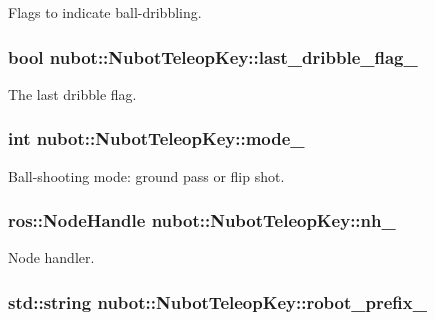 Flags to indicate ball-\/dribbling. 

\hypertarget{classnubot_1_1NubotTeleopKey_a60e6eb5b4d57a2b379f64db50a6c783d}{
\subsubsection[{last\-\_\-dribble\-\_\-flag\-\_\-}]{\setlength{\rightskip}{0pt plus 5cm}bool nubot\-::\-Nubot\-Teleop\-Key\-::last\-\_\-dribble\-\_\-flag\-\_\-\hspace{0.3cm}{\ttfamily [private]}}}\label{classnubot_1_1NubotTeleopKey_a60e6eb5b4d57a2b379f64db50a6c783d}


The last dribble flag. 

\hypertarget{classnubot_1_1NubotTeleopKey_a5d4f917773136b83f6ba268f50c8a0ea}{
\subsubsection[{mode\-\_\-}]{\setlength{\rightskip}{0pt plus 5cm}int nubot\-::\-Nubot\-Teleop\-Key\-::mode\-\_\-\hspace{0.3cm}{\ttfamily [private]}}}\label{classnubot_1_1NubotTeleopKey_a5d4f917773136b83f6ba268f50c8a0ea}


Ball-\/shooting mode\-: ground pass or flip shot. 

\hypertarget{classnubot_1_1NubotTeleopKey_aa0685c9872576f6ce3b19b6f467e5cee}{
\subsubsection[{nh\-\_\-}]{\setlength{\rightskip}{0pt plus 5cm}ros\-::\-Node\-Handle nubot\-::\-Nubot\-Teleop\-Key\-::nh\-\_\-\hspace{0.3cm}{\ttfamily [private]}}}\label{classnubot_1_1NubotTeleopKey_aa0685c9872576f6ce3b19b6f467e5cee}


Node handler. 

\hypertarget{classnubot_1_1NubotTeleopKey_a1dbd680214196cf4eb9cfe4f817d8158}{
\subsubsection[{robot\-\_\-prefix\-\_\-}]{\setlength{\rightskip}{0pt plus 5cm}std\-::string nubot\-::\-Nubot\-Teleop\-Key\-::robot\-\_\-prefix\-\_\-\hspace{0.3cm}{\ttfamily [private]}}}\label{classnubot_1_1NubotTeleopKey_a1dbd680214196cf4eb9cfe4f817d8158}


